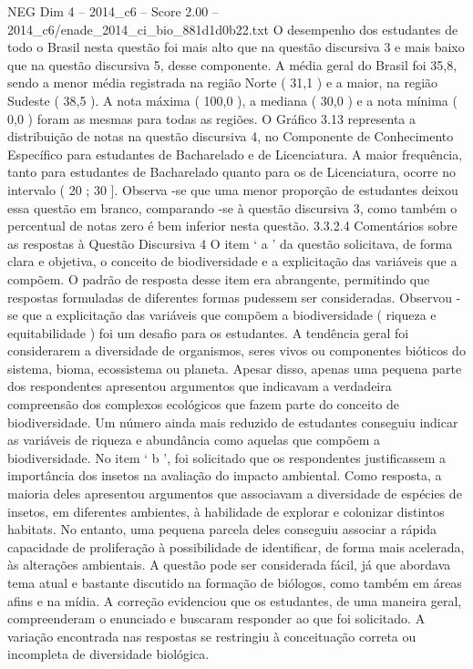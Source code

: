 \begin{textsample}{NEG Dim 4 – 2014\_c6 – Score 2.00 – 2014\_c6/enade\_2014\_ci\_bio\_881d1d0b22.txt}
O desempenho dos estudantes de todo o Brasil nesta questão foi mais alto que na questão discursiva 3 e mais baixo que na questão discursiva 5, desse componente.
A média geral do Brasil foi 35,8, sendo a menor média registrada na região Norte ( 31,1 ) e a maior, na região Sudeste ( 38,5 ).
A nota máxima ( 100,0 ), a mediana ( 30,0 ) e a nota mínima ( 0,0 ) foram as mesmas para todas as regiões.
O Gráfico 3.13 representa a distribuição de notas na questão discursiva 4, no Componente de Conhecimento Específico para estudantes de Bacharelado e de Licenciatura.
A maior frequência, tanto para estudantes de Bacharelado quanto para os de Licenciatura, ocorre no intervalo ( 20 ; 30 ].
Observa -se que uma menor proporção de estudantes deixou essa questão em branco, comparando -se à questão discursiva 3, como também o percentual de notas zero é bem inferior nesta questão. 3.3.2.4 Comentários sobre as respostas à Questão Discursiva 4 O item ‘ a ’ da questão solicitava, de forma clara e objetiva, o conceito de biodiversidade e a explicitação das variáveis que a compõem.
O padrão de resposta desse item era abrangente, permitindo que respostas formuladas de diferentes formas pudessem ser consideradas.
Observou -se que a explicitação das variáveis que compõem a biodiversidade ( riqueza e equitabilidade ) foi um desafio para os estudantes.
A tendência geral foi considerarem a diversidade de organismos, seres vivos ou componentes bióticos do sistema, bioma, ecossistema ou planeta.
Apesar disso, apenas uma pequena parte dos respondentes apresentou argumentos que indicavam a verdadeira compreensão dos complexos ecológicos que fazem parte do conceito de biodiversidade.
Um número ainda mais reduzido de estudantes conseguiu indicar as variáveis de riqueza e abundância como aquelas que compõem a biodiversidade.
No item ‘ b ’, foi solicitado que os respondentes justificassem a importância dos insetos na avaliação do impacto ambiental.
Como resposta, a maioria deles apresentou argumentos que associavam a diversidade de espécies de insetos, em diferentes ambientes, à habilidade de explorar e colonizar distintos habitats.
No entanto, uma pequena parcela deles conseguiu associar a rápida capacidade de proliferação à possibilidade de identificar, de forma mais acelerada, às alterações ambientais.
A questão pode ser considerada fácil, já que abordava tema atual e bastante discutido na formação de biólogos, como também em áreas afins e na mídia.
A correção evidenciou que os estudantes, de uma maneira geral, compreenderam o enunciado e buscaram responder ao que foi solicitado.
A variação encontrada nas respostas se restringiu à conceituação correta ou incompleta de diversidade biológica.

\end{textsample}
